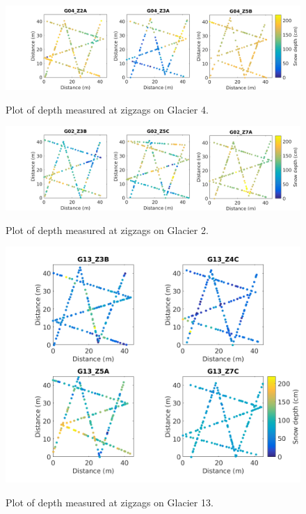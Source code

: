 \documentclass[12pt]{article}
\begin{document}
\begin{landscape}
\begin{figure}
	\includegraphics[width = 20 cm]{ZigzagDepth_G04.png}\\
	\caption{Plot of depth measured at zigzags on Glacier 4.}
	\label{fig:ZZ_G04}
\end{figure}

\begin{figure}
	\centering
	\includegraphics[width = 20 cm]{ZigzagDepth_G02.png}\\
	\caption{Plot of depth measured at zigzags on Glacier 2.}
	\label{fig:ZZ_G02}
\end{figure}
\end{landscape}

\begin{figure}[H] 
	\centering
	\includegraphics[width = \textwidth]{ZigzagDepth_G13.png}\\
	\caption{Plot of depth measured at zigzags on Glacier 13.}
	\label{fig:ZZ_G13}
\end{figure}
\end{document}

